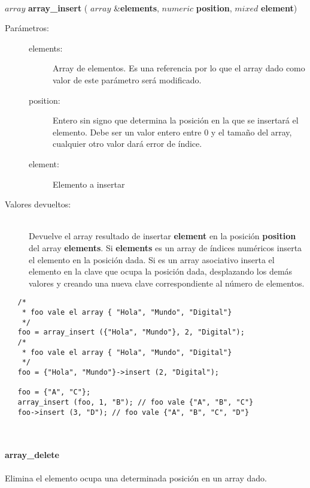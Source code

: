 \hfill \\ $array$ \textbf{array\_insert} ( $array$ \&\textbf{elements}, $numeric$ \textbf{position}, $mixed$ \textbf{element})  
\begin{description}
\item [Parámetros:] \hfill 
   \begin{description}
   \item[elements:] Array de elementos. Es una referencia por lo que el array dado como valor de este parámetro será modificado. 
   \item[position:] Entero sin signo que determina la posición en la que se insertará el elemento. Debe ser un valor entero entre $0$ y
   el tamaño del array, cualquier otro valor dará error de índice.
   \item[element:] Elemento a insertar
   \end{description}
\item[Valores devueltos:] \hfill \\
   Devuelve el array resultado de insertar \textbf{element} en la posición \textbf{position} del array \textbf{elements}.
   Si \textbf{elements} es un array de índices numéricos inserta el elemento en la posición dada. Si 
   es un array asociativo inserta el elemento en la clave que ocupa la posición dada, desplazando los demás valores y creando
   una nueva clave correspondiente al número de elementos.
\end{description}
     
\begin{lstlisting}   
   /*
    * foo vale el array { "Hola", "Mundo", "Digital"}
    */
   foo = array_insert ({"Hola", "Mundo"}, 2, "Digital"); 
   /*
    * foo vale el array { "Hola", "Mundo", "Digital"}
    */
   foo = {"Hola", "Mundo"}->insert (2, "Digital");
   
   foo = {"A", "C"};
   array_insert (foo, 1, "B"); // foo vale {"A", "B", "C"}
   foo->insert (3, "D"); // foo vale {"A", "B", "C", "D"}
\end{lstlisting}
\hfill\\ 

\paragraph{array\_delete}
Elimina el elemento ocupa una determinada posición en un array dado.

